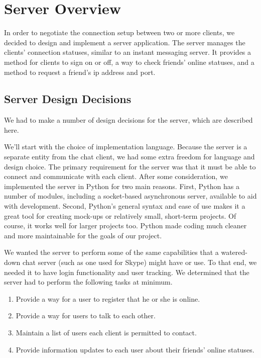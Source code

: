 
\section{Server Overview}

In order to negotiate the connection setup between two or more clients, we decided to
design and implement a server application. The server 
manages the clients' connection statuses, similar to an instant messaging
server.
It provides a method for clients to sign on or off, a way to check friends' online
statuses, and a method to request a friend's ip address and port.

\subsection{Server Design Decisions}

We had to make a number of design decisions for the server, which are described here.

We'll start with the choice of implementation language. Because the server is a
separate entity from the chat client, we had some extra freedom for language and
design choice. The primary requirement for the server was that it must be able
to connect and communicate with each client. After some consideration, we
implemented the server in Python for two main reasons. First, Python
has a number of modules, including a socket-based asynchronous server, available
to aid with development. Second, Python's general syntax and ease of use makes
it a great tool for creating mock-ups or relatively small, short-term projects.
Of course, it works well for larger projects too. Python made coding much
cleaner and more maintainable for the goals of our project.

We wanted the server to perform some of the same capabilities that a
watered-down chat server (such as one used for Skype) might have or use. To that
end, we needed it to have login functionality and user tracking. We determined
that the server had to perform the following tasks at minimum.

\begin{enumerate}
  \item Provide a way for a user to register that he or she is online.
  \item Provide a way for users to talk to each other.
  \item Maintain a list of users each client is permitted to contact.
  \item Provide information updates to each user about their friends' online statuses.
\end{enumerate}

